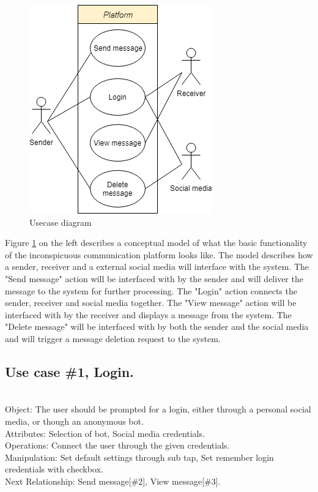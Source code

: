 \begin{table}[H]
    \begin{minipage}{.5\textwidth}
        \begin{figure}[H]
            \centering
            \includegraphics[width=0.75\linewidth]{Projectdoc/Assets/Illustrationer/simple-usecase-eng.png}
            \caption{Usecase diagram}
            \label{fig:usecase}
        \end{figure}
    \end{minipage}
    \begin{minipage}{.5\textwidth}
        \noindent
        Figure \ref{fig:usecase} on the left describes a conceptual model of what the basic functionality of the inconspicuous communication platform looks like. The model describes how a sender, receiver and a external social media will interface with the system. The "Send message" action will be interfaced with by the sender and will deliver the message to the system for further processing. The "Login" action connects the sender, receiver and social media together. The "View message" action will be interfaced with by the receiver and displays a message from the system. The "Delete message" will be interfaced with by both the sender and the social media and will trigger a message deletion request to the system.
    \end{minipage}
\end{table}

\subsection{Use case \#1, Login.}\\
\label{usecase_bot}
Object: The user should be prompted for a login, either through a personal social media, or though an anonymous bot.\\
Attributes: Selection of bot, Social media credentials.\\
Operations: Connect the user through the given credentials.\\
Manipulation: Set default settings through sub tap,  Set remember login credentials with checkbox.\\
Next Relationship: Send message[\#2], View message[\#3].
\noindent
